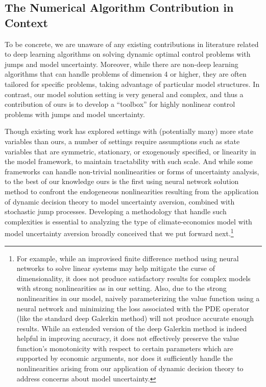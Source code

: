 \documentclass[12pt]{article}
\begin{document}
\subsection{The Numerical Algorithm Contribution in Context}

To be concrete, we are unaware of any existing contributions in literature related to deep learning algorithms on solving dynamic optimal control problems with jumps and model uncertainty. Moreover, while there are non-deep learning algorithms that can handle problems of dimension 4 or higher, they are often tailored for specific problems, taking advantage of particular model structures. In contrast, our model solution setting is very general and complex, and thus a contribution of ours is to develop a ``toolbox'' for highly nonlinear control problems with jumps and model uncertainty. 

Though existing work has explored settings with (potentially many) more state variables than ours, a number of settings require assumptions such as state variables that are symmetric, stationary, or exogenously specified, or linearity in the model framework, to maintain tractability with such scale. And while some frameworks can handle non-trivial nonlinearities or forms of uncertainty analysis, to the best of our knowledge ours is the first using neural network solution method to confront the endogeneous nonlinearities resulting from the application of dynamic decision theory to model uncertainty aversion, combined with stochastic jump processes. Developing a methodology that handle such complexities is essential to analyzing the type of climate-economics model with model uncertainty aversion broadly conceived that we put forward next.\footnote{For example, while an improvised finite difference method using neural networks to solve linear systems may help mitigate the curse of dimensionality, it does not produce satisfactory results for complex models with strong nonlinearities as in our setting. Also, due to the strong nonlinearities in our model, naively parameterizing the value function using a neural network and minimizing the loss associated with the PDE operator (like the standard deep Galerkin method) will not produce accurate enough results. While an extended version of the deep Galerkin method \citep{al2022extensions, duarte2018machine} is indeed helpful in improving accuracy, it does not effectively preserve the value function's monotonicity with respect to certain parameters which are supported by economic arguments, nor does it sufficiently handle the nonlinearities arising from our application of dynamic decision theory to address concerns about model uncertainty. }
\end{document}
